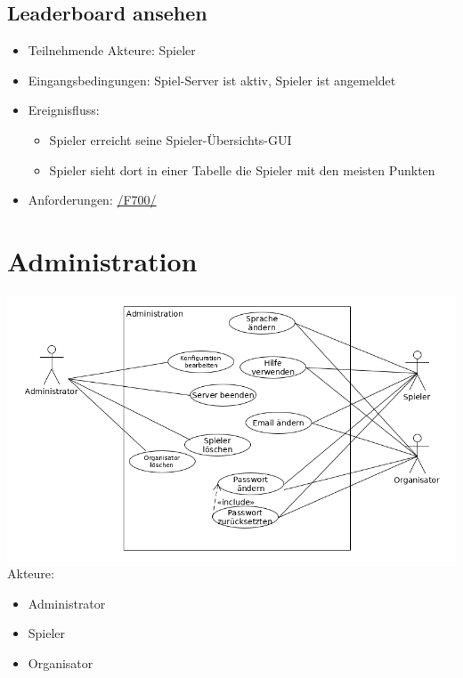 \documentclass[a4paper]{scrreprt}
\begin{document}
    \subsection{Leaderboard ansehen}
    \begin{itemize}
        \item Teilnehmende Akteure: \Gls{Spieler}
        \item Eingangsbedingungen: \Gls{Spiel-Server} ist aktiv, \Gls{Spieler} ist angemeldet
        \item Ereignisfluss:
        \begin{itemize}
            \item \Gls{Spieler} erreicht seine Spieler-Übersichts-GUI
            \item \Gls{Spieler} sieht dort in einer Tabelle die \Gls{Spieler} mit den meisten Punkten
        \end{itemize}
        \item Anforderungen: \hyperlink{F700}{/F700/}
    \end{itemize}

    \newpage
    \section{Administration}
    \includegraphics[width=\textwidth]{uml/export/Administration.png}
    Akteure:
    \begin{itemize}
    \item \Gls{Administrator}
    \item \Gls{Spieler}
    \item \Gls{Organisator}
   
    \end{itemize}
\end{document}
